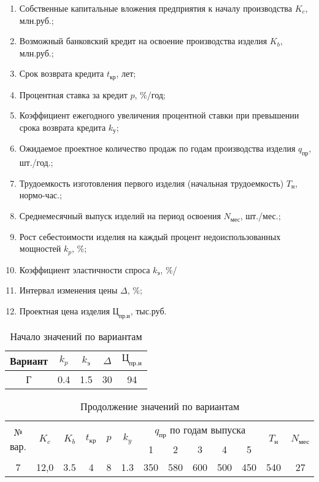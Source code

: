 \begin{enumerate}
    \item Собственные капитальные вложения предприятия к началу производства $K_c$, млн.руб.;
    \item Возможный банковский кредит на освоение производства изделия $K_b$, млн.руб.;
    \item Срок возврата кредита $t_{\text{кр}}$, лет;
    \item Процентная ставка за кредит $p$, \%/год;
    \item Коэффициент ежегодного увеличения процентной ставки при превышении срока возврата кредита $k_{\text{у}}$;
    \item Ожидаемое проектное количество продаж по годам производства изделия $q_{\text{пр}}$, шт./год.;
    \item Трудоемкость изготовления первого изделия (начальная трудоемкость) $T_{\text{н}}$, нормо-час.;
    \item Среднемесячный выпуск изделий на период освоения $N_{\text{мес}}$, шт./мес.;
    \item Рост себестоимости изделия на каждый процент недоиспользованных мощностей $k_{p}$, \%;
    \item Коэффициент эластичности спроса $k_{\text{э}}$, \%/%
    \item Интервал изменения цены $\Delta$, \%;
    \item Проектная цена изделия $\text{Ц}_{\text{пр.и}}$, тыс.руб.
\end{enumerate}

\begin{table}
\caption{Начало значений по вариантам}
\begin{tabular}{|c|c|c|c|c|}
\hline
Вариант & $k_p$ & $k_{\text{э}}$ & $\Delta$ & $\text{Ц}_{\text{пр.и}}$ \\
\hline
Г & 0.4 & 1.5 & 30 & 94 \\
\hline
\end{tabular}
\end{table}

\begin{table}
\caption{Продолжение значений по вариантам}
\begin{tabular}{|c|c|c|c|c|c|c|c|c|c|c|c|c|}
\hline
\multirow{2}{*}{№ вар.} & \multirow{2}{*}{$K_c$} & \multirow{2}{*}{$K_b$} & \multirow{2}{*}{$t_{\text{кр}}$} & \multirow{2}{*}{$p$} & \multirow{2}{*}{$k_y$} & \multicolumn{5}{c|}{$q_{\text{пр}}$ по годам выпуска} & \multirow{2}{*}{$T_{\text{н}}$} & \multirow{2}{*}{$N_{\text{мес}}$} \\ \cline{7-11}
 &  &  &  &  &  & 1 & 2 & 3 & 4 & 5 &  &  \\ \hline
7 & 12,0 & 3.5 & 4 & 8 & 1.3 & 350 & 580 & 600 & 500 & 450 & 540 & 27 \\ \hline
\end{tabular}
\end{table}

